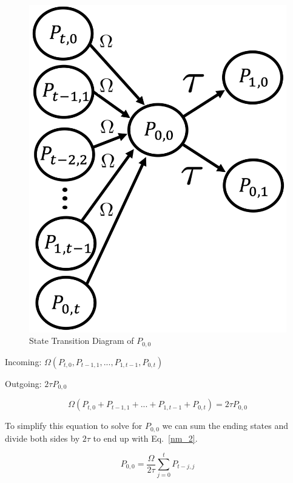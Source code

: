 \documentclass[conference]{IEEEtran}
\begin{document}
\begin{figure}[htbp]
    \centerline{\includegraphics[width=\linewidth]{Figures/P_0,0}}
    \caption{State Transition Diagram of $P_{0,0}$} 
    \label{P_0,0}
\end{figure}	

Incoming: $\Omega (P_{t,0}, P_{t-1,1}, ... , P_{1,t-1}, P_{0,t})$

Outgoing: $2 \tau P_{0,0}$

\begin{equation}
  \Omega(P_{t,0} + P_{t-1,1} +  ... + P_{1,t-1} + P_{0,t})= 2\tau P_{0,0}\label{nm_1}
\end{equation}

To simplify this equation to solve for $P_{0,0}$ we can sum the ending states and
divide both sides by $2\tau$ to end up with Eq.~\ref{nm_2}.

\begin{equation}
  P_{0,0} = \frac{\Omega}{2\tau}\sum_{j=0}^{t}{P_{t-j,j}}\label{nm_2}
\end{equation}
\end{document}
